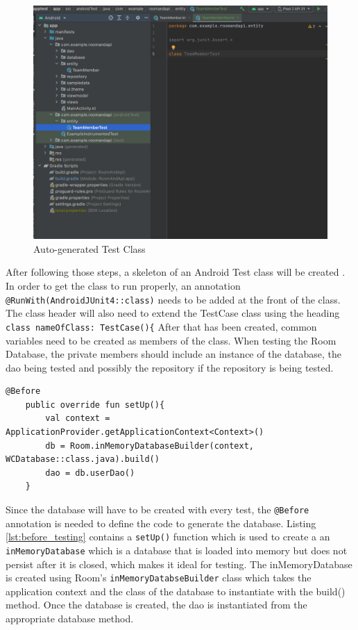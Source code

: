 \documentclass[12pt]{article}
\begin{document}
 \begin{figure}[H]
    \centering
    \includegraphics[trim=10 10 10 50, clip, width=\textwidth] {images/testing/5_result.png}
    \caption{Auto-generated Test Class}
    \label{fig:test_step_5}
\end{figure}
 
 After following those steps, a skeleton of an  Android Test class will be created . In order to get the class to run properly, an annotation \verb|@RunWith(AndroidJUnit4::class)| needs to be added at the front of the class. The class header will also need to extend the TestCase class using the heading \verb|class nameOfClass: TestCase(){| After that has been created, common variables need to be created as members of the class. When testing the Room Database, the private members should include an instance of the database, the dao being tested and possibly the repository if the repository is being tested.  

 \begin{lstlisting}[numbers=none, 
			caption=Code to Set up the Database in Test,
			label={lst:before_testing}]
@Before
    public override fun setUp(){
        val context = ApplicationProvider.getApplicationContext<Context>()
        db = Room.inMemoryDatabaseBuilder(context, WCDatabase::class.java).build()
        dao = db.userDao()
    }
\end{lstlisting}
 Since the database will have to be created with every test,  the \verb|@Before| annotation is needed to define the code to generate the database. Listing \ref{lst:before_testing} contains a \verb|setUp()| function which is used to create a an \verb|inMemoryDatabase| which is a database that is loaded into memory but does not persist after it is closed, which makes it ideal for testing. The inMemoryDatabase is created using Room's \verb|inMemoryDatabseBuilder| class which takes the application context and the class of the database to instantiate with the build() method. Once the database is created, the dao is instantiated from the appropriate database method.
\end{document}
